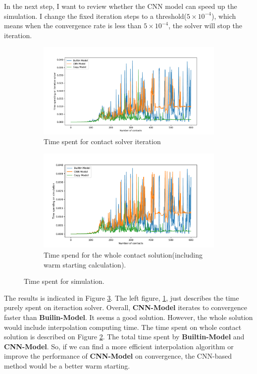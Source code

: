 In the next step, I want to review whether the CNN model can speed up the simulation. I change the fixed iteration steps to a threshold($5\times10^{-4}$), which means when the convergence rate is less than $5\times10^{-4}$, the solver will stop the iteration.
\begin{figure}[!h]
        \centering
        \begin{subfigure}[b]{0.8\textwidth}
            \includegraphics[width=\textwidth]{Figures/cnntime}
            \caption{Time spent for contact solver iteration}
            \label{fig:iter}
        \end{subfigure}
        \begin{subfigure}[b]{0.8\textwidth}
            \includegraphics[width=\textwidth]{Figures/cnntotal}
            \caption{Time spend for the whole contact solution(including warm starting calculation).}
            \label{Total}
        \end{subfigure}
        \caption{Time spent for simulation.}
        \label{fig:time}
\end{figure}
The results is indicated in Figure \ref{fig:time}. The left figure, \ref{fig:iter}, just describes the time purely spent on iteraction solver. Overall, \textbf{CNN-Model} iterates to convergence faster than \textbf{Builin-Model}. It seems a good solution. However, the whole solution would include interpolation computing time. The time spent on whole contact solution is described on Figure \ref{Total}. The total time spent by \textbf{Builtin-Model} and \textbf{CNN-Model}. So, if we can find a more efficient interpolation algorithm or improve the performance of \textbf{CNN-Model} on convergence, the CNN-based method would be a better warm starting.